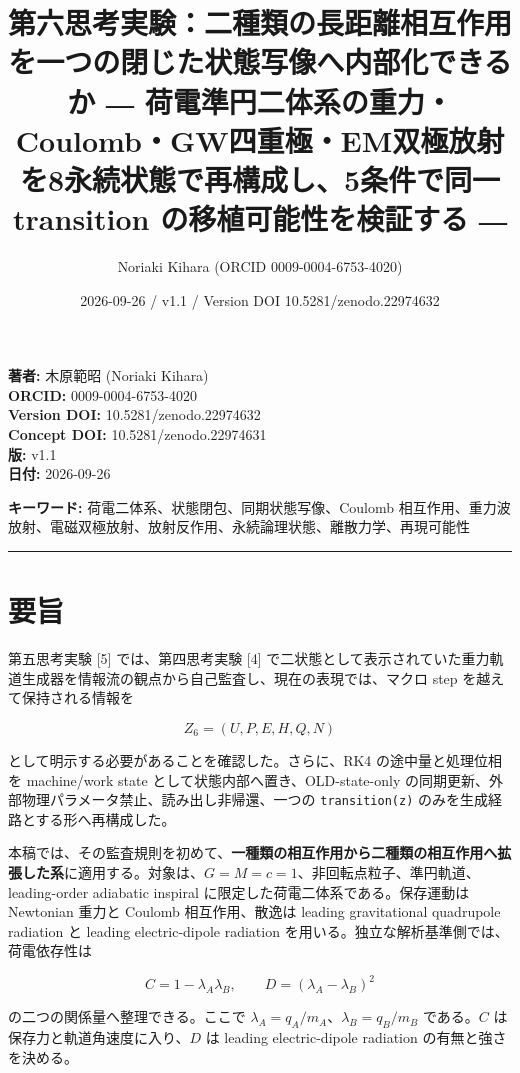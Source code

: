 \documentclass[
  a4paper,
]{ltjsarticle}
\title{第六思考実験：二種類の長距離相互作用を一つの閉じた状態写像へ内部化できるか
―
荷電準円二体系の重力・Coulomb・GW四重極・EM双極放射を8永続状態で再構成し、5条件で同一
transition の移植可能性を検証する ―}
\author{Noriaki Kihara (ORCID 0009-0004-6753-4020)}
\date{2026-09-26 / v1.1 / Version DOI 10.5281/zenodo.22974632}
\begin{document}
\maketitle

\textbf{著者:} 木原範昭 (Noriaki Kihara)\\
\textbf{ORCID:} 0009-0004-6753-4020\\
\textbf{Version DOI:} 10.5281/zenodo.22974632\\
\textbf{Concept DOI:} 10.5281/zenodo.22974631\\
\textbf{版:} v1.1\\
\textbf{日付:} 2026-09-26

\textbf{キーワード:} 荷電二体系、状態閉包、同期状態写像、Coulomb
相互作用、重力波放射、電磁双極放射、放射反作用、永続論理状態、離散力学、再現可能性

\begin{center}\rule{0.5\linewidth}{0.5pt}\end{center}

\section{要旨}\label{ux8981ux65e8}

第五思考実験 {[}5{]} では、第四思考実験 {[}4{]}
で二状態として表示されていた重力軌道生成器を情報流の観点から自己監査し、現在の表現では、マクロ
step を越えて保持される情報を

\[
Z_6=(U,P,E,H,Q,N)
\]

として明示する必要があることを確認した。さらに、RK4 の途中量と処理位相を
machine/work state として状態内部へ置き、OLD-state-only
の同期更新、外部物理パラメータ禁止、読み出し非帰還、一つの
\texttt{transition(z)} のみを生成経路とする形へ再構成した。

本稿では、その監査規則を初めて、\textbf{一種類の相互作用から二種類の相互作用へ拡張した系}に適用する。対象は、\(G=M=c=1\)、非回転点粒子、準円軌道、leading-order
adiabatic inspiral に限定した荷電二体系である。保存運動は Newtonian
重力と Coulomb 相互作用、散逸は leading gravitational quadrupole
radiation と leading electric-dipole radiation
を用いる。独立な解析基準側では、荷電依存性は

\[
C=1-\lambda_A\lambda_B,
\qquad
D=(\lambda_A-\lambda_B)^2
\]

の二つの関係量へ整理できる。ここで
\(\lambda_A=q_A/m_A\)、\(\lambda_B=q_B/m_B\) である。\(C\)
は保存力と軌道角速度に入り、\(D\) は leading electric-dipole radiation
の有無と強さを決める。
\end{document}
